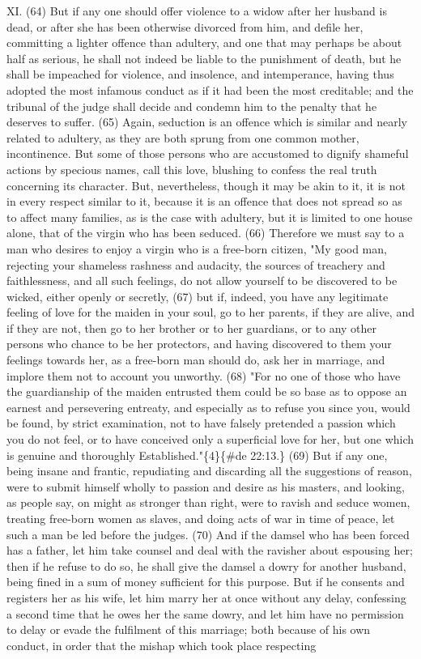 \documentclass[11pt]{article}
\begin{document}
\begin{quoe}
XI. (64) But if any one should offer violence to a widow after her husband is dead, or after she has been otherwise divorced from him, and defile her, committing a lighter offence than adultery, and one that may perhaps be about half as serious, he shall not indeed be liable to the punishment of death, but he shall be impeached for violence, and insolence, and intemperance, having thus adopted the most infamous conduct as if it had been the most creditable; and the tribunal of the judge shall decide and condemn him to the penalty that he deserves to suffer. (65) Again, seduction is an offence which is similar and nearly related to adultery, as they are both sprung from one common mother, incontinence. But some of those persons who are accustomed to dignify shameful actions by specious names, call this love, blushing to confess the real truth concerning its character. But, nevertheless, though it may be akin to it, it is not in every respect similar to it, because it is an offence that does not spread so as to affect many families, as is the case with adultery, but it is limited to one house alone, that of the virgin who has been seduced. (66) Therefore we must say to a man who desires to enjoy a virgin who is a free-born citizen, "My good man, rejecting your shameless rashness and audacity, the sources of treachery and faithlessness, and all such feelings, do not allow yourself to be discovered to be wicked, either openly or secretly, (67) but if, indeed, you have any legitimate feeling of love for the maiden in your soul, go to her parents, if they are alive, and if they are not, then go to her brother or to her guardians, or to any other persons who chance to be her protectors, and having discovered to them your feelings towards her, as a free-born man should do, ask her in marriage, and implore them not to account you unworthy. (68) "For no one of those who have the guardianship of the maiden entrusted them could be so base as to oppose an earnest and persevering entreaty, and especially as to refuse you since you, would be found, by strict examination, not to have falsely pretended a passion which you do not feel, or to have conceived only a superficial love for her, but one which is genuine and thoroughly Established."\{4\}\{\#de 22:13.\} (69) But if any one, being insane and frantic, repudiating and discarding all the suggestions of reason, were to submit himself wholly to passion and desire as his masters, and looking, as people say, on might as stronger than right, were to ravish and seduce women, treating free-born women as slaves, and doing acts of war in time of peace, let such a man be led before the judges. (70) And if the damsel who has been forced has a father, let him take counsel and deal with the ravisher about espousing her; then if he refuse to do so, he shall give the damsel a dowry for another husband, being fined in a sum of money sufficient for this purpose. But if he consents and registers her as his wife, let him marry her at once without any delay, confessing a second time that he owes her the same dowry, and let him have no permission to delay or evade the fulfilment of this marriage; both because of his own conduct, in order that the mishap which took place respecting 
\end{quoe}
\end{document}
